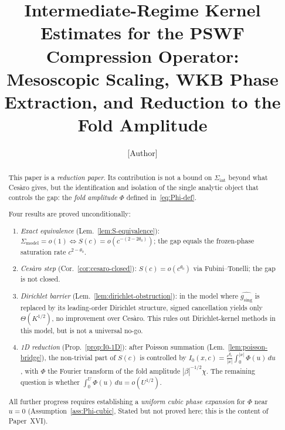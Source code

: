 \documentclass[12pt,a4paper]{amsart}
\theoremstyle{definition}
\theoremstyle{remark}
\newcommand{\gsing}{g_{\mathrm{sing}}}
\begin{document}
\title[Intermediate-Regime Kernel Estimates]{%
  Intermediate-Regime Kernel Estimates
  for the PSWF Compression Operator:\\
  Mesoscopic Scaling, WKB Phase Extraction,
  and Reduction to the Fold Amplitude}

\author{[Author]}
\address{[Address]}
\email{[Email]}

\begin{abstract}
This paper is a \emph{reduction paper}.
Its contribution is not a bound
on $\Sigma_{\mathrm{int}}$
beyond what Ces\`aro gives,
but the identification and
isolation of the single analytic
object that controls the gap:
the \emph{fold amplitude} $\Phi$
defined in~\eqref{eq:Phi-def}.

Four results are proved unconditionally:
\begin{enumerate}[\rm(1)]
\item \emph{Exact equivalence}
  (Lem.~\ref{lem:S-equivalence}):
  $\Sigma_{\mathrm{model}}=o(1)
  \iff S(c)=o(c^{-(2-2\theta_0)})$;
  the gap equals the
  frozen-phase saturation rate
  $c^{2-\theta_0}$.
\item \emph{Ces\`aro step}
  (Cor.~\ref{cor:cesaro-closed}):
  $S(c)=o(c^{\theta_0})$
  via Fubini--Tonelli;
  the gap is not closed.
\item \emph{Dirichlet barrier}
  (Lem.~\ref{lem:dirichlet-obstruction}):
  in the model where
  $\widehat{\gsing}$ is
  replaced by its leading-order
  Dirichlet structure,
  signed cancellation yields
  only $\Theta(K^{1/2})$,
  no improvement over Ces\`aro.
  This rules out
  Dirichlet-kernel methods
  in this model,
  but is not a universal no-go.
\item \emph{1D reduction}
  (Prop.~\ref{prop:I0-1D}):
  after Poisson summation
  (Lem.~\ref{lem:poisson-bridge}),
  the non-trivial part of $S(c)$
  is controlled by
  $I_0(x,c)=\frac{c^{\theta_0}}{|x|}
  \int_0^{|x|}\Phi(u)\,du$,
  with $\Phi$ the Fourier transform
  of the fold amplitude
  $|\beta|^{-1/2}\chi$.
  The remaining question is
  whether
  $\int_0^U\Phi(u)\,du=o(U^{1/2})$.
\end{enumerate}

\noindent
All further progress requires
establishing a \emph{uniform
cubic phase expansion}
for $\Phi$ near $u=0$
(Assumption~\ref{ass:Phi-cubic},
Stated but not proved here;
this is the content of Paper~XVI).
\end{abstract}

\maketitle
\end{document}
